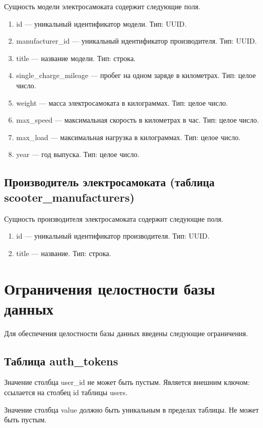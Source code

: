 Сущность модели электросамоката содержит следующие поля.

\begin{enumerate}
	\item id --- уникальный идентификатор модели. Тип: UUID.
	\item manufacturer\_id --- уникальный идентификатор производителя. Тип: UUID.
	\item title --- название модели. Тип: строка.
	\item single\_charge\_mileage --- пробег на одном заряде в километрах. Тип: целое число.
	\item weight --- масса электросамоката в килограммах. Тип: целое число.
	\item max\_speed --- максимальная скорость в километрах в час. Тип: целое число.
	\item max\_load --- максимальная нагрузка в килограммах. Тип: целое число.
	\item year --- год выпуска. Тип: целое число.
\end{enumerate}

\subsection{Производитель электросамоката (таблица scooter\_manufacturers)}

Сущность производителя электросамоката содержит следующие поля.

\begin{enumerate}
	\item id --- уникальный идентификатор производителя. Тип: UUID.
	\item title --- название. Тип: строка.
\end{enumerate}

\section{Ограничения целостности базы данных}

Для обеспечения целостности базы данных введены следующие ограничения.

\subsection{Таблица auth\_tokens}

Значение столбца user\_id не может быть пустым. Является внешним ключом: ссылается на столбец id таблицы users.

Значение столбца value должно быть уникальным в пределах таблицы. Не может быть пустым.


